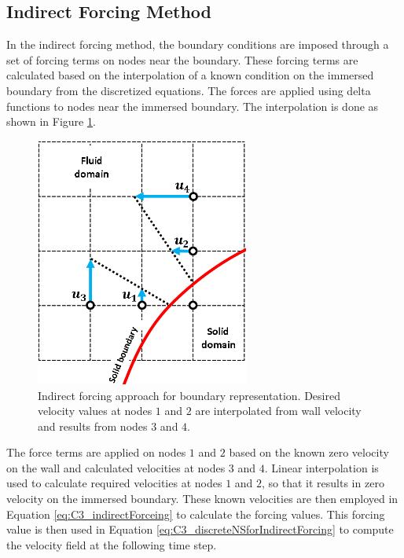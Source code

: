 \subsection{Indirect Forcing Method}
In the indirect forcing method, the boundary conditions are imposed through a set of forcing terms on nodes near the boundary. These forcing terms are calculated based on the interpolation of a known condition on the immersed boundary from the discretized equations. The forces are applied using delta functions to nodes near the immersed boundary. The interpolation is done as shown in Figure \ref{fig:C3_indiredctForcingMethod}.
%
\begin{figure}[H]
    \centering
    \includegraphics[width=7.00cm]{Chapter_3/figure/indirect_forcing_approach.png}
    \caption{Indirect forcing approach for boundary representation. Desired velocity values at nodes $1$ and $2$ are interpolated from wall velocity and results from nodes $3$ and $4$.}
    \label{fig:C3_indiredctForcingMethod}
\end{figure}
%
The force terms are applied on nodes $1$ and $2$ based on the known zero velocity on the wall and calculated velocities at nodes $3$ and $4$. Linear interpolation is used to calculate required velocities at nodes $1$ and $2$, so that it results in zero velocity on the immersed boundary. These known velocities are then employed in Equation \eqref{eq:C3_indirectForceing} to calculate the forcing values. This forcing value is then used in Equation \eqref{eq:C3_discreteNSforIndirectForcing} to compute the velocity field at the following time step.


